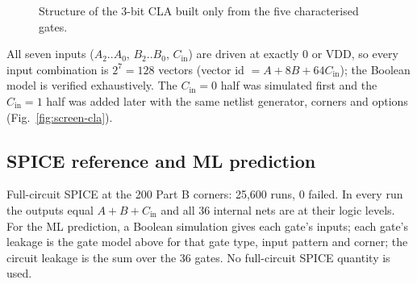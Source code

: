 \documentclass[11pt,a4paper]{article}
\begin{document}
\begin{figure}[H]
\centering
{}
\caption{Structure of the 3-bit CLA built only from the five characterised gates.}
\end{figure}

All seven inputs ($A_2..A_0$, $B_2..B_0$, $C_\text{in}$) are driven at exactly 0 or VDD, so every input
combination is $2^7 = 128$ vectors (vector id $= A + 8B + 64C_\text{in}$); the Boolean model is verified
exhaustively. The $C_\text{in} = 0$ half was simulated first and the $C_\text{in} = 1$ half was added later with
the same netlist generator, corners and options (Fig.~\ref{fig:screen-cla}).

\subsection{SPICE reference and ML prediction}
Full-circuit SPICE at the 200 Part B corners: 25{,}600 runs, 0 failed. In every run the outputs equal
$A + B + C_\text{in}$ and all 36 internal nets are at their logic levels. For the ML prediction, a Boolean
simulation gives each gate's inputs; each gate's leakage is the gate model above for that gate type, input
pattern and corner; the circuit leakage is the sum over the 36 gates. No full-circuit SPICE quantity is used.
\end{document}
